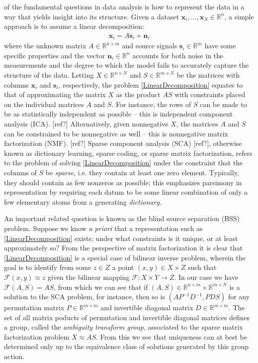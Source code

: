 \documentclass[journal,onecolumn]{IEEEtran}
\begin{document}
 of the fundamental questions in data analysis is how to represent the data in a way that yields insight into its structure. Given a dataset $\mathbf{x}_i, \ldots, \mathbf{x}_N \in \mathbb{R}^n$, a simple approach is to assume a linear decomposition:
\begin{align}\label{LinearDecomposition}
\mathbf{x}_i = A\mathbf{s}_i + \mathbf{n}_i 
\end{align}
%
where the unknown matrix $A \in \mathbb{R}^{n \times m}$ and source signals $\mathbf{s}_i \in \mathbb{R}^{m}$ have some specific properties and the vector $\mathbf{n}_i \in \mathbb{R}^n$ accounts for both noise in the measurements and the degree to which the model fails to accurately capture the structure of the data. Letting $X \in \mathbb{R}^{n \times N}$ and $S \in \mathbb{R}^{m \times N}$ be the matrices with columns $\mathbf{x}_i$ and $\mathbf{s}_i$, respectively, the problem \eqref{LinearDecomposition} equates to that of approximating the matrix $X$ as the product $AS$ with constraints placed on the individual matrices $A$ and $S$. For instance, the rows of $S$ can be made to be as statistically independent as possible -- this is independent component analysis (ICA). [ref?] Alternatively, given nonnegative $X$, the matrices $A$ and $S$ can be constrained to be nonnegative as well -- this is nonnegative matrix factorization (NMF). [ref?] Sparse component analysis (SCA) [ref?], otherwise known as dictionary learning, sparse coding, or sparse matrix factorization, refers to the problem of solving \eqref{LinearDecomposition} under the constraint that the columns of $S$ be \emph{sparse}, i.e. they contain at least one zero element. Typically, they should contain as few nonzeros as possible; this emphasizes parsimony in representation by requiring each datum to be some linear combination of only a few elementary atoms from a generating \emph{dictionary}.

An important related question is known as the blind source separation (BSS) problem. Suppose we know \emph{a priori} that a representation such as \eqref{LinearDecomposition} exists; under what constraints is it unique, or at least approximately so? From the perspective of matrix factorization it is clear that \eqref{LinearDecomposition} is a special case of bilinear inverse problem, wherein the goal is to identify from some $z \in Z$ a point $(x,y) \in X \times Z$ such that $\mathcal{F}(x,y) \approx z$ given the bilinear mapping $\mathcal{F}: X \times Y \to Z$. In our case we have $\mathcal{F}(A,S) = AS$, from which we can see that if $(A,S) \in \mathbb{R}^{n \times m} \times \mathbb{R}^{m \times N}$ is a solution to the SCA problem, for instance, then so is $(AP^{-1}D^{-1},PDS)$ for any permutation matrix $P \in \mathbb{R}^{m \times m}$ and invertible diagonal matrix $D \in \mathbb{R}^{m \times m}$. The set of all matrix poducts of permutation and invertible diagonal matrices defines a group, called the \emph{ambiguity transform group}, associated to the sparse matrix factorization problem $X \approx AS$. From this we see that uniqueness can at best be determined only up to the equivalence class of solutions generated by this group action. 
\end{document}
